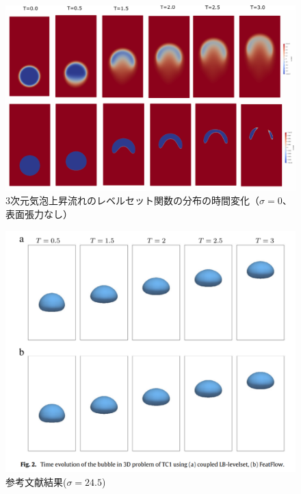 \begin{figure}[H]
	\centering
	\includegraphics[width=18truecm]{pics/3d-bubble/levelset_t0-3.pdf}
	\caption{3次元気泡上昇流れのレベルセット関数の分布の時間変化（$\sigma=0$、表面張力なし）}
	\label{fig:3d-bubble-result_sigma0}
\end{figure}

\begin{figure}[H]
	\centering
	\includegraphics[width=10truecm]{pics/3d-bubble/result-ref.pdf}
	\caption{参考文献結果($\sigma=24.5$)\cite{Safi2017}}
	\label{fig:3d-bubble-result-ref}
\end{figure}